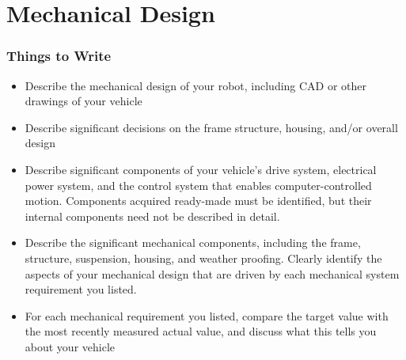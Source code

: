 \section{Mechanical Design}
\subsubsection*{Things to Write}

\begin{itemize}
  \item Describe the mechanical design of your robot, including CAD or other drawings of your vehicle
  \item Describe significant decisions on the frame structure, housing, and/or overall design
  \item Describe significant components of your vehicle's drive system, electrical power system, and the control system that enables computer-controlled motion. Components acquired ready-made must be identified, but their internal components need not be described in detail.
  \item Describe the significant mechanical components, including the frame, structure, suspension, housing, and weather proofing. Clearly identify the aspects of your mechanical design that are driven by each mechanical system requirement you listed.
  \item For each mechanical requirement you listed, compare the target value with the most recently measured actual value, and discuss what this tells you about your vehicle
\end{itemize}
